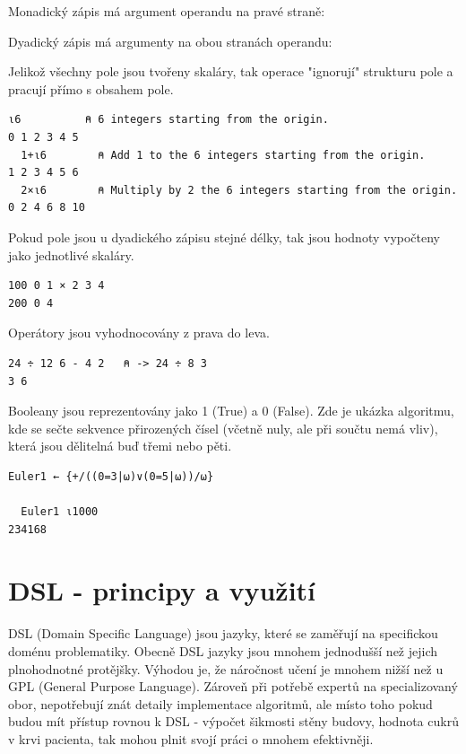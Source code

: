 \documentclass[male,czech]{kithesis}
\newcommand{\aplInline}[1]{\colorbox{gray!10}{{\apl{#1}}}}
\begin{document}
Monadický zápis má argument operandu na pravé straně:
\aplInline{-5    ⍝ monadic}

Dyadický zápis má argumenty na obou stranách operandu:
\aplInline{10-7  ⍝ dyadic}

Jelikož všechny pole jsou tvořeny skaláry, tak operace "ignorují" strukturu pole a pracují přímo 
s obsahem pole.

\begin{lstlisting}[language=apl,extendedchars=true]
  ⍳6          ⍝ 6 integers starting from the origin.
0 1 2 3 4 5
  1+⍳6        ⍝ Add 1 to the 6 integers starting from the origin.
1 2 3 4 5 6
  2×⍳6        ⍝ Multiply by 2 the 6 integers starting from the origin.
0 2 4 6 8 10
\end{lstlisting}

Pokud pole jsou u dyadického zápisu stejné délky, tak jsou hodnoty vypočteny jako jednotlivé 
skaláry.

\begin{lstlisting}[language=apl,extendedchars=true]
  100 0 1 × 2 3 4
200 0 4
\end{lstlisting}

Operátory jsou vyhodnocovány z prava do leva.

\begin{lstlisting}[language=apl,extendedchars=true]
  24 ÷ 12 6 - 4 2   ⍝ -> 24 ÷ 8 3
3 6
\end{lstlisting}

Booleany jsou reprezentovány jako 1 (True) a 0 (False). Zde je ukázka algoritmu, kde 
se sečte sekvence přirozených čísel (včetně nuly, ale při součtu nemá vliv), 
která jsou dělitelná buď třemi nebo pěti.

\begin{lstlisting}[language=apl,extendedchars=true]
  Euler1 ← {+/((0=3|⍵)∨(0=5|⍵))/⍵}

  Euler1 ⍳1000
234168
\end{lstlisting}

\chapter{DSL - principy a využití}
DSL (Domain Specific Language) jsou jazyky, které se zaměřují na specifickou doménu problematiky.
Obecně DSL jazyky jsou mnohem jednodušší než jejich plnohodnotné protějšky. Výhodou je, že 
náročnost učení je mnohem nižší než u GPL (General Purpose Language). Zároveň při potřebě 
expertů na specializovaný obor, nepotřebují znát detaily 
implementace algoritmů, ale místo toho pokud budou mít přístup rovnou k DSL - výpočet šikmosti stěny budovy,
hodnota cukrů v krvi pacienta, tak mohou plnit svojí práci o mnohem efektivněji. \cite{DomainSpecificLanguages}
\end{document}
